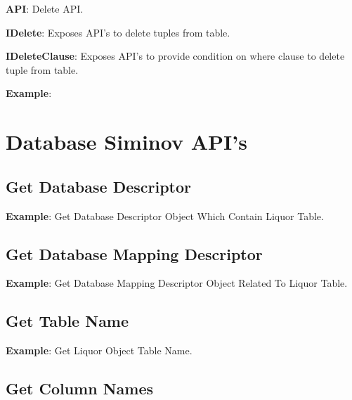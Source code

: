 			\textbf{API}: Delete API.
				
		
			\textbf{IDelete}:  Exposes API's to delete tuples from table.

				

			
			\textbf{IDeleteClause}: Exposes API's to provide condition on where clause to delete tuple from table.
				

			\textbf{Example}: 
				
	

\section{Database Siminov API's}


	\subsection{Get Database Descriptor}
	

				\par
				\textbf{Example}: Get Database Descriptor Object Which Contain Liquor Table.
					


	\subsection{Get Database Mapping Descriptor}
	

				\par
				\textbf{Example}: Get Database Mapping Descriptor Object Related To Liquor Table.
					


	\subsection{Get Table Name}
	

				\par
				\textbf{Example}: Get Liquor Object Table Name.
					
		

	\subsection{Get Column Names}
	

